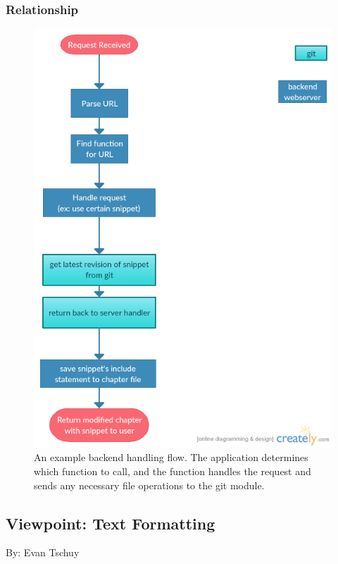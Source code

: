 \documentclass[letterpaper, 10pt, draftclsnofoot, compsoc, onecolumn]{IEEEtran}
\begin{document}
\subsubsection{Relationship}
\begin{figure}[ht!]
\centering
\includegraphics[scale=0.5]{backend.png}
\caption{An example backend handling flow. The application determines which function
to call, and the function handles the request and sends any necessary file operations
to the git module.}
\end{figure}
\pagebreak





\subsection{Viewpoint: Text Formatting}
{\noindent By: Evan Tschuy \par}
\end{document}
